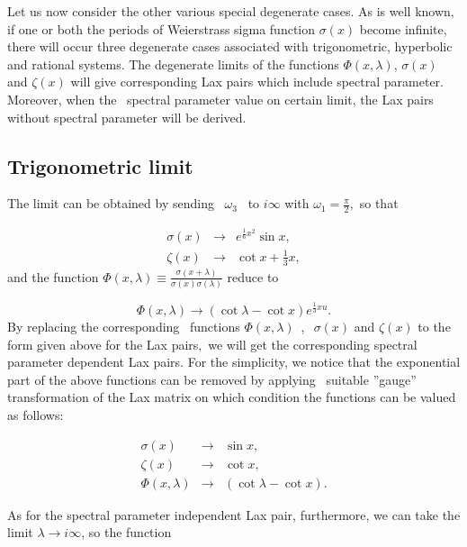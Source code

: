 \documentclass[a4paper,12pt]{article}
\begin{document}
\setcounter{equation}{0} \label{degen} Let us now consider the other various
special degenerate cases. As is well known, if one or both
the periods of Weierstrass sigma function $\sigma (x)$
become infinite, there will occur three degenerate cases
associated with trigonometric, hyperbolic and rational
systems. The degenerate limits of the functions $\Phi
(x,\lambda )$, $
\sigma (x)$ and $\zeta (x)$ will give corresponding Lax pairs which include
spectral parameter. Moreover, when the \ spectral parameter
value on certain limit, the Lax pairs without spectral
parameter will be derived.

\subsection{Trigonometric limit}

The limit can be obtained by sending \ $\omega _{3}$ \ to
$i\infty $ with $
\omega _{1}=\frac{\pi }{2},$ so that

\begin{eqnarray}
\sigma (x) &\rightarrow &e^{\frac{1}{6}x^{2}}\sin x,  \nonumber \\
\zeta (x) &\rightarrow &\cot x+\frac{1}{3}x,  \label{Tlimit}
\end{eqnarray}
and the function $\Phi (x,\lambda )\equiv \frac{\sigma
(x+\lambda )}{\sigma (x)\sigma (\lambda )}$ reduce to

\begin{equation}
\Phi (x,\lambda )\rightarrow (\cot \lambda -\cot x)e^{\frac{1}{3}xu}.
\end{equation}
By replacing the corresponding \ functions $\Phi (x,\lambda
)$\ ,\ $\ \sigma (x)$ and $\zeta (x)$ to the form given
above for the Lax pairs$,$ we will get the corresponding
spectral parameter dependent Lax pairs. For the simplicity,
we notice that the exponential part of the above functions
can be removed by applying \ suitable ''gauge''
transformation of the Lax matrix on which condition the
functions can be valued as follows:

\begin{eqnarray}
\sigma (x) &\rightarrow &\sin x,  \nonumber \\
\zeta (x) &\rightarrow &\cot x, \\
\Phi (x,\lambda ) &\rightarrow &(\cot \lambda -\cot x).	 \nonumber
\end{eqnarray}

As for the spectral parameter independent Lax pair,
furthermore, we can take the limit $\lambda \rightarrow
i\infty $, so the function
\end{document}
